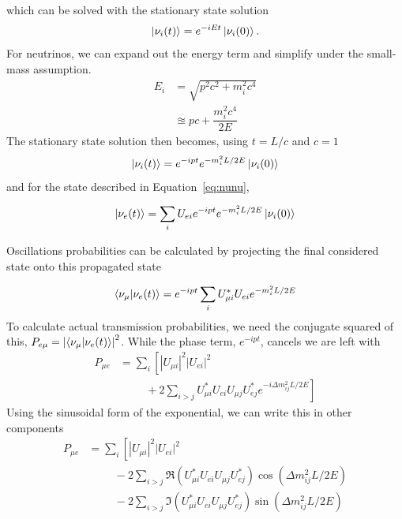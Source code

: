 \documentclass[main.tex]{subfiles}
\begin{document}
which can be solved with the stationary state solution 
\begin{equation}
    \left| \nu_{i} (t) \right >  =  e^{-iEt} \left| \nu_{i} (0) \right >.
\end{equation}
For neutrinos, we can expand out the energy term and simplify under the small-mass assumption. 
\begin{align}
    E_{i} &= \sqrt{p^{2}c^{2} + m_{i}^{2}c^{4}} \\
    &\approxeq pc + \dfrac{m_{i}^{2}c^{4}}{2E}
\end{align}
The stationary state solution then becomes, using $t=L/c$ and $c=1$ 
\begin{equation}
    \left| \nu_{i} (t) \right >  =  e^{-ipt}e^{ -m_{i}^{2}L/2E}\left| \nu_{i} (0) \right >
\end{equation}
and for the state described in Equation~\eqref{eq:nunu},

\begin{equation}
    \left| \nu_{e}(t) \right > = \sum\limits_{i} U_{ei} e^{-ipt}e^{ -m_{i}^{2}L/2E}\left| \nu_{i} (0) \right >
\end{equation}

Oscillations probabilities can be calculated by projecting the final considered state onto this propagated state


\begin{equation}
    \left< \nu_{\mu} | \nu_{e}(t) \right> = e^{-ipt} \sum\limits_{i} U_{\mu i}^{*}U_{ei} e^{ -m_{i}^{2}L/2E}
\end{equation}
To calculate actual transmission probabilities, we need the conjugate squared of this, $P_{e\mu} = \left|\left< \nu_{\mu}|\nu_{e}(t) \right>\right|^{2}$. While the phase term, $e^{-ipt}$, cancels we are left with 
\begin{equation}\begin{split}
P_{\mu e}&= \sum\limits_{i}\left[\left|U_{\mu i}\right|^{2}\left|U_{e i}\right|^{2} \right.\\
&\hspace{1cm} + 2\sum\limits_{i>j}U_{\mu i}^{*}U_{e i}U_{\mu j}U_{e j}^{*}\left.e^{-i\Delta m_{ij}^{2}L/2E} \right]
\end{split}\end{equation} 
Using the sinusoidal form of the exponential, we can write this in other components 
\begin{equation}\begin{split}
    P_{\mu e}&= \sum\limits_{i}\left[\left|U_{\mu i}\right|^{2}\left|U_{e i}\right|^{2} \right.\\
    &\hspace{1cm} -2\sum\limits_{i>j} \Re(U_{\mu i}^{*}U_{e i}U_{\mu j}U_{e j}^{*})\cos\left(\Delta m_{ij}^{2}L/2E \right) \\
    &\hspace{1cm} -2\sum\limits_{i>j}\Im(U_{\mu i}^{*}U_{e i}U_{\mu j}U_{e j}^{*})\sin\left(\Delta m_{ij}^{2}L/2E \right)
\end{split}\end{equation} 
\end{document}
